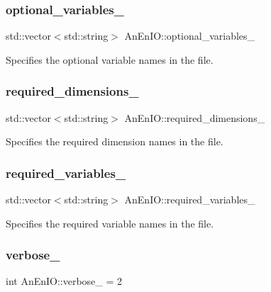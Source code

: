 \subsubsection{\texorpdfstring{optional\+\_\+variables\+\_\+}{optional\_variables\_}}
{\footnotesize\ttfamily std\+::vector$<$std\+::string$>$ An\+En\+I\+O\+::optional\+\_\+variables\+\_\+\hspace{0.3cm}{\ttfamily [protected]}}

Specifies the optional variable names in the file. \mbox{\label{class_an_en_i_o_adf42061631c78508bde00de7d22a65b4}} 
\subsubsection{\texorpdfstring{required\+\_\+dimensions\+\_\+}{required\_dimensions\_}}
{\footnotesize\ttfamily std\+::vector$<$std\+::string$>$ An\+En\+I\+O\+::required\+\_\+dimensions\+\_\+\hspace{0.3cm}{\ttfamily [protected]}}

Specifies the required dimension names in the file. \mbox{\label{class_an_en_i_o_a119dcb81d3811547f0e37d6c3752f0a7}} 
\subsubsection{\texorpdfstring{required\+\_\+variables\+\_\+}{required\_variables\_}}
{\footnotesize\ttfamily std\+::vector$<$std\+::string$>$ An\+En\+I\+O\+::required\+\_\+variables\+\_\+\hspace{0.3cm}{\ttfamily [protected]}}

Specifies the required variable names in the file. \mbox{\label{class_an_en_i_o_a4f6abd007730e4a8f54d57cc3572bd9e}} 
\subsubsection{\texorpdfstring{verbose\+\_\+}{verbose\_}}
{\footnotesize\ttfamily int An\+En\+I\+O\+::verbose\+\_\+ = 2\hspace{0.3cm}{\ttfamily [protected]}}

